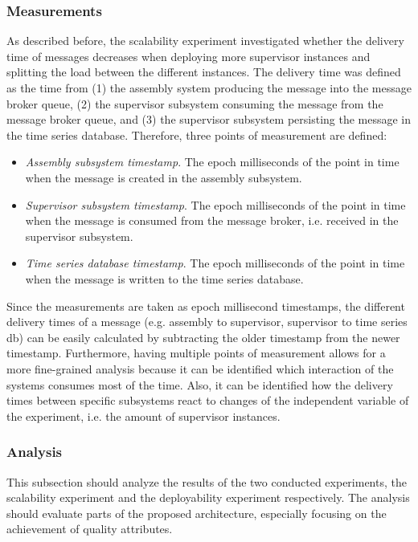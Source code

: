 \documentclass[conference]{IEEEtran}
\begin{document}
\subsubsection{Measurements}
\label{sec:measurements}
As described before, the scalability experiment investigated whether the delivery time of messages decreases when deploying more supervisor instances and splitting the load between the different instances. The delivery time was defined as the time from (1) the assembly system producing the message into the message broker queue, (2) the supervisor subsystem consuming the message from the message broker queue, and (3) the supervisor subsystem persisting the message in the time series database. Therefore, three points of measurement are defined:

\begin{itemize}
  \item \textit{Assembly subsystem timestamp}. The epoch milliseconds of the point in time when the message is created in the assembly subsystem.
  \item \textit{Supervisor subsystem timestamp}. The epoch milliseconds of the point in time when the message is consumed from the message broker, i.e. received in the supervisor subsystem.
  \item \textit{Time series database timestamp}. The epoch milliseconds of the point in time when the message is written to the time series database.
\end{itemize}

Since the measurements are taken as epoch millisecond timestamps, the different delivery times of a message (e.g. assembly to supervisor, supervisor to time series db) can be easily calculated by subtracting the older timestamp from the newer timestamp. Furthermore, having multiple points of measurement allows for a more fine-grained analysis because it can be identified which interaction of the systems consumes most of the time. Also, it can be identified how the delivery times between specific subsystems react to changes of the independent variable of the experiment, i.e. the amount of supervisor instances.

\subsubsection{Analysis}
\label{sec:analysis}

This subsection should analyze the results of the two conducted experiments, the scalability experiment and the deployability experiment respectively. The analysis should evaluate parts of the proposed architecture, especially focusing on the achievement of quality attributes.
\end{document}
